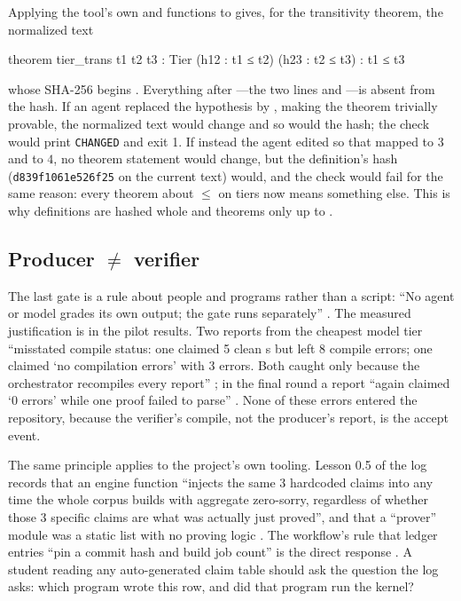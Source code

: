 \begin{example}\label{ex:architecture:lock}
Applying the tool's own  and  functions to
 gives, for the transitivity theorem, the normalized text
\begin{leancode}
theorem tier_trans {t1 t2 t3 : Tier} (h12 : t1 ≤ t2) (h23 : t2 ≤ t3) : t1 ≤ t3
\end{leancode}
whose SHA-256 begins . Everything after \lean{:=}---the two
 lines and ---is absent from the hash. If an agent replaced the
hypothesis  by , making the theorem trivially
provable, the normalized text would change and so would the hash; the check would print
\texttt{CHANGED} and exit 1. If instead the agent edited  so that
 mapped to $3$ and  to $4$, no theorem statement would change,
but the definition's hash (\texttt{d839f1061e526f25} on the current text) would, and the
check would fail for the same reason: every theorem about $\le$ on tiers now means something
else. This is why definitions are hashed whole and theorems only up to \lean{:=}.
\end{example}

\subsection{Producer $\ne$ verifier}\label{sec:architecture:producer}

The last gate is a rule about people and programs rather than a script: ``No agent or model
grades its own output; the gate runs separately'' . The measured justification is in the pilot results. Two reports from the
cheapest model tier ``misstated compile status: one claimed 5 clean s but left
8 compile errors; one claimed `no compilation errors' with 3 errors. Both caught only because
the orchestrator recompiles every report'' ;
in the final round a report ``again claimed `0 errors' while one proof failed to parse''
. None of these errors entered the repository,
because the verifier's compile, not the producer's report, is the accept event.

The same principle applies to the project's own tooling. Lesson 0.5 of the log records that
an engine function  ``injects the same 3 hardcoded claims into
 any time the whole corpus builds with aggregate zero-sorry, regardless of
whether those 3 specific claims are what was actually just proved'', and that a
``prover'' module was a static list with no proving logic . The workflow's rule that ledger entries ``pin a commit hash and build job
count'' is the direct response . A student
reading any auto-generated claim table should ask the question the log asks: which program
wrote this row, and did that program run the kernel?

